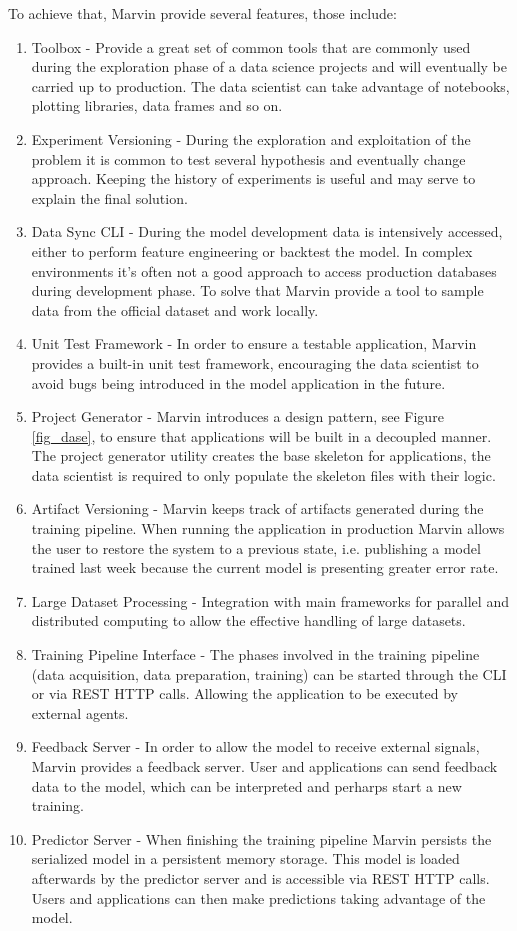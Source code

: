 \documentclass[twoside,11pt]{article}
\begin{document}
To achieve that, Marvin provide several features, those include:
\begin{enumerate}
    \item Toolbox - Provide a great set of common tools that are commonly used during the exploration phase of a data science projects and will eventually be carried up to production. The data scientist can take advantage of notebooks, plotting libraries, data frames and so on.
    \item Experiment Versioning - During the exploration and exploitation of the problem it is common to test several hypothesis and eventually change approach. Keeping the history of experiments is useful and may serve to explain the final solution.
    \item Data Sync CLI - During the model development data is intensively accessed, either to perform feature engineering or backtest the model. In complex environments it's often not a good approach to access production databases during development phase. To solve that Marvin provide a tool to sample data from the official dataset and work locally.
    \item Unit Test Framework - In order to ensure a testable application, Marvin provides a built-in unit test framework, encouraging the data scientist to avoid bugs being introduced in the model application in the future.
    \item Project Generator - Marvin introduces a design pattern, see Figure \ref{fig_dase}, to ensure that applications will be built in a decoupled manner. The project generator utility creates the base skeleton for applications, the data scientist is required to only populate the skeleton files with their logic.
    \item Artifact Versioning - Marvin keeps track of artifacts generated during the training pipeline. When running the application in production Marvin allows the user to restore the system to a previous state, i.e. publishing a model trained last week because the current model is presenting greater error rate.
    \item Large Dataset Processing - Integration with main frameworks for parallel and distributed computing to allow the effective handling of large datasets.
    \item Training Pipeline Interface - The phases involved in the training pipeline (data acquisition, data preparation, training) can be started through the CLI or via REST HTTP calls. Allowing the application to be executed by external agents.
    \item Feedback Server - In order to allow the model to receive external signals, Marvin provides a feedback server. User and applications can send feedback data to the model, which can be interpreted and perharps start a new training.
    \item Predictor Server - When finishing the training pipeline Marvin persists the serialized model in a persistent memory storage. This model is loaded afterwards by the predictor server and is accessible via REST HTTP calls. Users and applications can then make predictions taking advantage of the model.
\end{enumerate}
\end{document}
